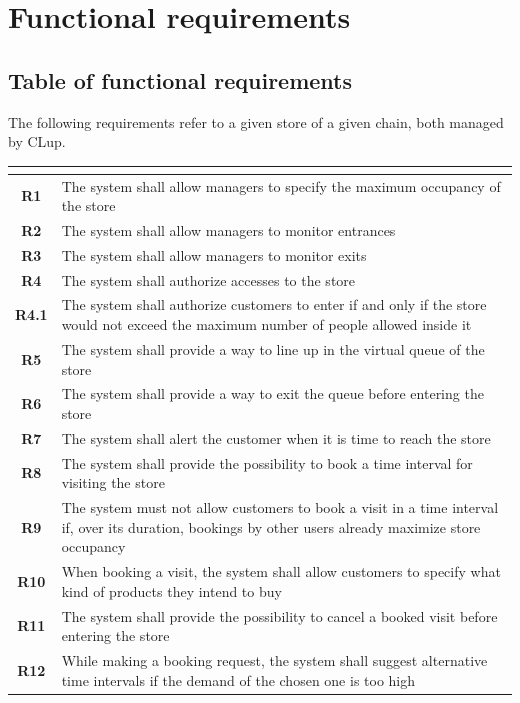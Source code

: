 \documentclass[a4paper,oneside,11pt]{book}   %
\begin{document}
    \section{Functional requirements}
    \subsection{Table of functional requirements}
    The following requirements refer to a given store of a given chain, both managed by CLup.
    \begin{longtable}[c]{|>{\bfseries{}}c|V{.65\textwidth}|}
        \hline
         \\
        \hline
        R1   & The system shall allow managers to specify the maximum occupancy of the store \\ \hline
        R2   & The system shall allow managers to monitor entrances \\ \hline
        R3   & The system shall allow managers to monitor exits \\ \hline
        R4   & The system shall authorize accesses to the store \\ \hline
        R4.1 & The system shall authorize customers to enter if and only if the store would not exceed the maximum number of people allowed inside it \\ \hline
        R5   & The system shall provide a way to line up in the virtual queue of the store \\ \hline
        R6   & The system shall provide a way to exit the queue before entering the store \\ \hline
        R7   & The system shall alert the customer when it is time to reach the store \\ \hline
        R8   & The system shall provide the possibility to book a time interval for visiting the store \\ \hline
        R9   & The system must not allow customers to book a visit in a time interval if, over its duration, bookings by other users already maximize store occupancy \\ \hline
        R10  & When booking a visit, the system shall allow customers to specify what kind of products they intend to buy \\ \hline
        R11  & The system shall provide the possibility to cancel a booked visit before entering the store \\ \hline
        R12  & While making a booking request, the system shall suggest alternative time intervals if the demand of the chosen one is too high \\ \hline

\end{longtable}
\end{document}
